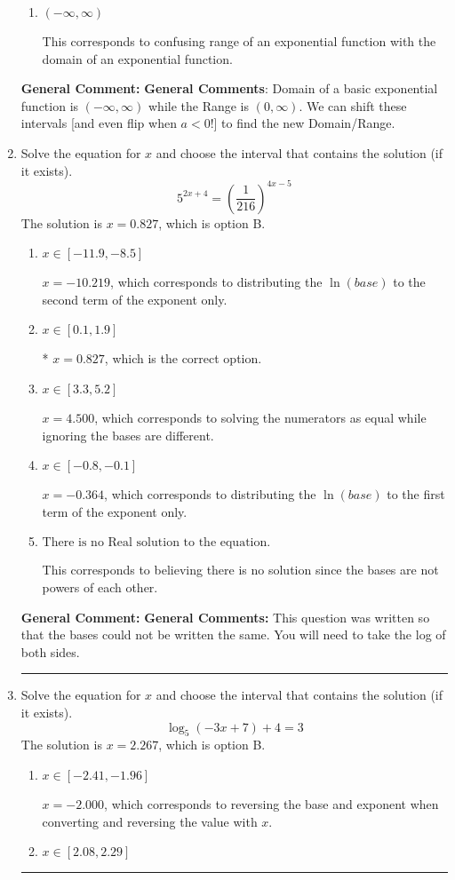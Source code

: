 \documentclass{extbook}[14pt]
\newcommand{\litem}[1]{\item #1

\rule{\textwidth}{0.4pt}}
\begin{document}
\begin{enumerate}
{\begin{enumerate}[label=\Alph*.]
$(-\infty, -4]$, which corresponds to including the endpoint.
\item \( (-\infty, \infty) \)

This corresponds to confusing range of an exponential function with the domain of an exponential function.
\end{enumerate}

\textbf{General Comment:} \textbf{General Comments}: Domain of a basic exponential function is $(-\infty, \infty)$ while the Range is $(0, \infty)$. We can shift these intervals [and even flip when $a<0$!] to find the new Domain/Range.
}
\litem{
Solve the equation for $x$ and choose the interval that contains the solution (if it exists).
\[ 5^{2x+4} = \left(\frac{1}{216}\right)^{4x-5} \]The solution is \( x = 0.827 \), which is option B.\begin{enumerate}[label=\Alph*.]
\item \( x \in [-11.9, -8.5] \)

$x = -10.219$, which corresponds to distributing the $\ln(base)$ to the second term of the exponent only.
\item \( x \in [0.1, 1.9] \)

* $x = 0.827$, which is the correct option.
\item \( x \in [3.3, 5.2] \)

$x = 4.500$, which corresponds to solving the numerators as equal while ignoring the bases are different.
\item \( x \in [-0.8, -0.1] \)

$x = -0.364$, which corresponds to distributing the $\ln(base)$ to the first term of the exponent only.
\item \( \text{There is no Real solution to the equation.} \)

This corresponds to believing there is no solution since the bases are not powers of each other.
\end{enumerate}

\textbf{General Comment:} \textbf{General Comments:} This question was written so that the bases could not be written the same. You will need to take the log of both sides.
}
\litem{
Solve the equation for $x$ and choose the interval that contains the solution (if it exists).
\[ \log_{5}{(-3x+7)}+4 = 3 \]The solution is \( x = 2.267 \), which is option B.\begin{enumerate}[label=\Alph*.]
\item \( x \in [-2.41, -1.96] \)

$x = -2.000$, which corresponds to reversing the base and exponent when converting and reversing the value with $x$.
\item \( x \in [2.08, 2.29] \)


\end{enumerate}}
\end{enumerate}
\end{document}
